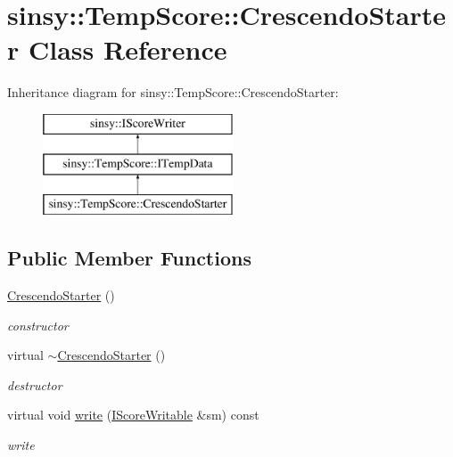\hypertarget{classsinsy_1_1TempScore_1_1CrescendoStarter}{\section{sinsy\-:\-:\-Temp\-Score\-:\-:\-Crescendo\-Starter \-Class \-Reference}
\label{classsinsy_1_1TempScore_1_1CrescendoStarter}
}
\-Inheritance diagram for sinsy\-:\-:\-Temp\-Score\-:\-:\-Crescendo\-Starter\-:\begin{figure}[H]
\begin{center}
\leavevmode
\includegraphics[height=3.000000cm]{classsinsy_1_1TempScore_1_1CrescendoStarter}
\end{center}
\end{figure}
\subsection*{\-Public \-Member \-Functions}
\begin{DoxyCompactItemize}
\item 
\hypertarget{classsinsy_1_1TempScore_1_1CrescendoStarter_a4381cb2cc61856ee2e992eb1eecb4b0b}{\hyperlink{classsinsy_1_1TempScore_1_1CrescendoStarter_a4381cb2cc61856ee2e992eb1eecb4b0b}{\-Crescendo\-Starter} ()}\label{classsinsy_1_1TempScore_1_1CrescendoStarter_a4381cb2cc61856ee2e992eb1eecb4b0b}

\begin{DoxyCompactList}\small\item\em constructor \end{DoxyCompactList}\item 
\hypertarget{classsinsy_1_1TempScore_1_1CrescendoStarter_a04f9cc7926c84987755085f449adb3aa}{virtual \hyperlink{classsinsy_1_1TempScore_1_1CrescendoStarter_a04f9cc7926c84987755085f449adb3aa}{$\sim$\-Crescendo\-Starter} ()}\label{classsinsy_1_1TempScore_1_1CrescendoStarter_a04f9cc7926c84987755085f449adb3aa}

\begin{DoxyCompactList}\small\item\em destructor \end{DoxyCompactList}\item 
\hypertarget{classsinsy_1_1TempScore_1_1CrescendoStarter_a0b75a155b850ea55d3a0fac5f2cbed0a}{virtual void \hyperlink{classsinsy_1_1TempScore_1_1CrescendoStarter_a0b75a155b850ea55d3a0fac5f2cbed0a}{write} (\hyperlink{classsinsy_1_1IScoreWritable}{\-I\-Score\-Writable} \&sm) const }\label{classsinsy_1_1TempScore_1_1CrescendoStarter_a0b75a155b850ea55d3a0fac5f2cbed0a}

\begin{DoxyCompactList}\small\item\em write \end{DoxyCompactList}\end{DoxyCompactItemize}



